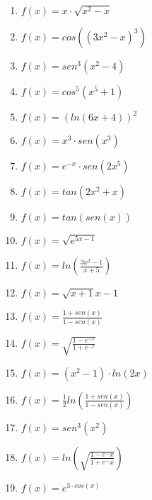 \begin{enumerate}[label=b\alph*.,topsep=0pt]
	\item $ f(x) =  x \cdot \sqrt{x^2-x}$
	\item $ f(x) =  cos((3x^2 -x)^3)$
	\item $f(x) = sen^3(x^2-4)$
	\item $f(x) = cos^5(x^5+1)$
	\item $f(x) = (ln(6x+4))^2$
	\item $f(x) = x^3 \cdot sen(x^3)$
	\item $f(x) = e^{-x} \cdot sen(2x^5)$
	\item $f(x) = tan(2x^2+x)$
	\item $f(x) = tan(sen(x))$
	\item $f(x) = \sqrt{e^{5x-1}}$
	\item $f(x) = ln(\frac{3x^2-1}{x+5})$
	\item $f(x) = \sqrt{x+1}{x-1}$
	\item $f(x) = \frac{1+sen(x)}{1-sen(x)}$
	\item $f(x) = \sqrt{\frac{1-e^{-x}}{1+e^{-x}}}$
	\item $f(x) = (x^2-1)\cdot ln(2x)$
	\item $f(x) = \frac{1}{2} ln(\frac{1+sen(x)}{1-sen(x)})$
	\item $f(x) = sen^3(x^2)$
	\item $f(x) = ln(\sqrt{\frac{1-e^-x}{1+e^-x}})$
	\item $f(x) = e^{3 \cdot cos(x)}$
\end{enumerate}
